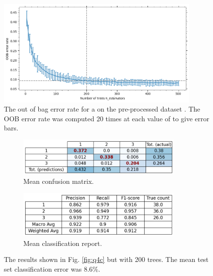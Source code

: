     \begin{figure}[htb]
    \centering
    \includegraphics[width=0.9\textwidth]{./figures/q4d}
    \caption{The out of bag error rate for a  on the pre-processed dataset
        . The OOB error rate was computed 20 times at each value of
         to give error bars.}
        \label{fig:q4d}
    \end{figure}

    \begin{figure}[htb]
    \centering
    \begin{subfigure}{0.5\textwidth}
        \centering
        \includegraphics[width=0.9\textwidth]{./figures/q4d_confusion_matrix_200_trees}
        \caption{Mean confusion matrix.}
        \label{fig:q4d_confusion_matrix_200_trees}
    \end{subfigure}%
    \begin{subfigure}{0.5\textwidth}
        \centering
        \includegraphics[width=0.9\textwidth]{./figures/q4d_classification_report_200_trees}
        \caption{Mean classification report.}
        \label{fig:q4d_classification_report_200_trees}
    \end{subfigure}
    \caption{The results shown in Fig. \eqref{fig:q4c} but with 200 trees. The mean test set classification error was
        8.6\%.}
    \label{fig:q4d_200_trees}
    \end{figure}

